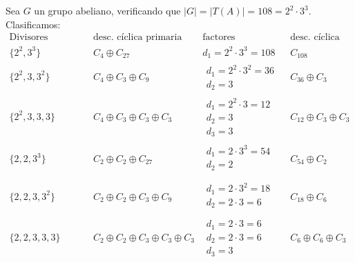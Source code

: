 \documentclass[12pt]{article}
\begin{document}
\begin{ejercicio}
\begin{enumerate}[label=(\alph*)]
            Sea $G$ un grupo abeliano, verificando que $|G| = |T(A)| = 108 = 2^2 \cdot 3^3$. Clasificamos:
            \begin{equation*}
                \begin{array}{c|c|c|c}
                    \text{Divisores elementales} & \text{desc. cíclica primaria} & \text{factores invariantes} & \text{desc. cíclica} \\
                    \hline
                    \{2^2, 3^3\} & C_4 \oplus C_{27} & d_1= 2^2\cdot 3^3 = 108 & C_{108} \\
                    \hline
                    \{2^2,3,3^2\} & C_4\oplus C_3\oplus C_9 & \begin{array}{c}
                            d_1 = 2^2 \cdot 3^2 = 36 \\
                            d_2 = 3
                    \end{array}& C_{36}\oplus C_3 \\
                    \hline
                    \{2^2, 3, 3, 3\} & C_4\oplus C_3\oplus C_3\oplus C_3 & \begin{array}{c}
                            d_1 = 2^2 \cdot 3 = 12 \\
                            d_2 = 3 \\
                            d_3 = 3
                    \end{array}& C_{12} \oplus C_3 \oplus C_3 \\
                    \hline
                    \{2, 2, 3^3\} & C_2\oplus C_2\oplus C_{27} & \begin{array}{c}
                            d_1 = 2 \cdot 3^3 = 54 \\
                            d_2 = 2 \\
                    \end{array}& C_{54} \oplus C_2 \\
                    \hline
                    \{2, 2, 3, 3^2\} & C_2\oplus C_2\oplus C_{3} \oplus C_{9} & \begin{array}{c}
                            d_1 = 2 \cdot 3^2 = 18 \\
                            d_2 = 2 \cdot 3 = 6 \\
                    \end{array}& C_{18} \oplus C_6 \\
                    \hline
                    \{2, 2, 3, 3, 3\} & C_2\oplus C_2\oplus C_{3} \oplus C_{3} \oplus C_3 & \begin{array}{c}
                            d_1 = 2 \cdot 3 = 6 \\
                            d_2 = 2 \cdot 3 = 6 \\
                            d_3 = 3
                    \end{array}& C_{6} \oplus C_6 \oplus C_3 \\
                \end{array}
            \end{equation*}


\end{enumerate}
\end{ejercicio}
\end{document}
